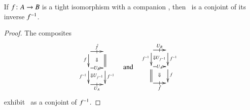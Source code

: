 

\begin{lem}\label{thm:comp-iso}
  If $f\colon A\to B$ is a tight isomorphism with a companion \fhat,
  then \fhat\ is a conjoint of its inverse $f^{-1}$.
\end{lem}
\begin{proof}
  The composites
  \[\vcenter{\xymatrix@-.5pc{
      \ar[r]|-@{|}^{\fhat}\ar[d]_f \ar@{}[dr]|{\Downarrow} &
      \ar@{=}[d]\\
      \ar[r]|{U_B}\ar[d]_{f\inv} \ar@{}[dr]|{\Downarrow U_{f\inv}} &
      \ar[d]^{f\inv}\\
      \ar[r]|-@{|}_{U_A} &
    }}\quad\text{and}\quad
  \vcenter{\xymatrix@-.5pc{
      \ar[r]|-@{|}^{U_B}\ar[d]_{f\inv} \ar@{}[dr]|{\Downarrow U_{f\inv}} &
      \ar[d]^{f\inv}\\
      \ar[r]|{U_A}\ar@{=}[d] \ar@{}[dr]|{\Downarrow} &
      \ar[d]^f\\
      \ar[r]|-@{|}_{\fhat} &
    }}
  \]
  exhibit \fhat\ as a conjoint of $f^{-1}$.
\end{proof}

